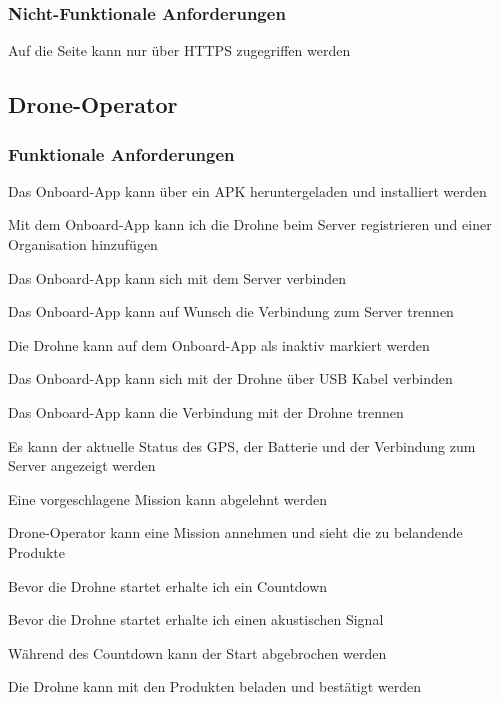 \subsubsection{Nicht-Funktionale Anforderungen}
\begin{todolist}
	\item[\done] Auf die Seite kann nur über HTTPS zugegriffen werden
\end{todolist}


\subsection{Drone-Operator}
\subsubsection{Funktionale Anforderungen}
\begin{todolist}
	\item[\done] Das Onboard-App kann über ein APK heruntergeladen und installiert werden
	\item[\done] Mit dem Onboard-App kann ich die Drohne beim Server registrieren und einer Organisation hinzufügen
	\item[\done] Das Onboard-App kann sich mit dem Server verbinden
	\item[\done] Das Onboard-App kann auf Wunsch die Verbindung zum Server trennen
	\item[\done] Die Drohne kann auf dem Onboard-App als inaktiv markiert werden
	\item[\done] Das Onboard-App kann sich mit der Drohne über USB Kabel verbinden
	\item[\done] Das Onboard-App kann die Verbindung mit der Drohne trennen
	\item[\done] Es kann der aktuelle Status des GPS, der Batterie und der Verbindung zum Server angezeigt werden
	\item[\done] Eine vorgeschlagene Mission kann abgelehnt werden
	\item[\done] Drone-Operator kann eine Mission annehmen und sieht die zu belandende Produkte
	\item[\done] Bevor die Drohne startet erhalte ich ein Countdown
	\item[\done] Bevor die Drohne startet erhalte ich einen akustischen Signal
	\item[\done] Während des Countdown kann der Start abgebrochen werden
	\item[\done] Die Drohne kann mit den Produkten beladen und bestätigt werden
\end{todolist}


